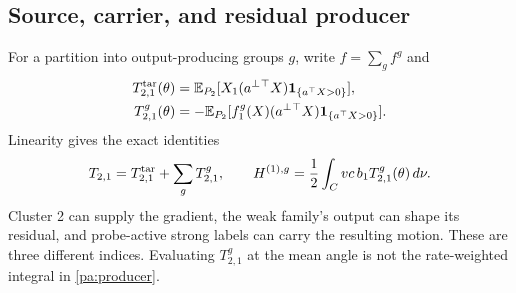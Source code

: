 \documentclass[11pt]{article}
\numberwithin{equation}{section}
\theoremstyle{definition}
\theoremstyle{remark}
\newcommand{\E}{\mathbb E}
\newcommand{\1}{\mathbf 1}
\newcommand{\dd}{\,d}
\begin{document}
\subsection{Source, carrier, and residual producer}
For a partition into output-producing groups $g$, write $f=\sum_g f^g$ and
\begin{align*}
 T_{2,1}^{\rm tar}(\theta)&=\E_{P_2}[X_1(a^\perp{}^\top X)
 \1_{\{a^\top X>0\}}],\\
 T_{2,1}^{g}(\theta)&=-\E_{P_2}[f_1^g(X)(a^\perp{}^\top X)
 \1_{\{a^\top X>0\}}].
\end{align*}
Linearity gives the exact identities
\begin{equation}\label{pa:producer}
 T_{2,1}=T_{2,1}^{\rm tar}+\sum_gT_{2,1}^g,\qquad
 H^{(1),g}=\frac12\int_C vc\,b_1T_{2,1}^g(\theta)\dd\nu.
\end{equation}
Cluster 2 can supply the gradient, the weak family's output can shape its
residual, and probe-active strong labels can carry the resulting motion.
These are three different indices. Evaluating $T_{2,1}^g$ at the mean angle
is not the rate-weighted integral in \eqref{pa:producer}.
\end{document}
